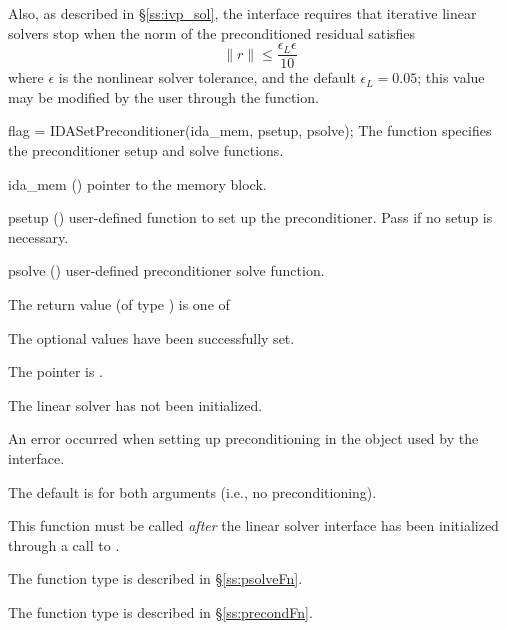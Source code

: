 {Also, as described in \S\ref{ss:ivp_sol}, the {\idals} interface
requires that iterative linear solvers stop when the norm of the
preconditioned residual satisfies
\[
  \|r\| \le \frac{\epsilon_L \epsilon}{10}
\]
where $\epsilon$ is the nonlinear solver tolerance, and the default
$\epsilon_L = 0.05$; this value may be modified by the user through
the  function.


{
  flag = IDASetPreconditioner(ida\_mem, psetup, psolve);
}
{
  The function  specifies the preconditioner
  setup and solve functions.
}
{
  \begin{args}
  \item[ida\_mem] ()
    pointer to the {\idas} memory block.
  \item[psetup] ()
    user-defined function to set up the preconditioner.  Pass  if no
    setup is necessary.
  \item[psolve] ()
    user-defined preconditioner solve function.
  \end{args}
}
{
  The return value  (of type ) is one of
  \begin{args}
  \item[\Id{IDALS\_SUCCESS}]
    The optional values have been successfully set.
  \item[\Id{IDALS\_MEM\_NULL}]
    The  pointer is .
  \item[\Id{IDALS\_LMEM\_NULL}]
    The {\idals} linear solver has not been initialized.
  \item[\Id{IDALS\_SUNLS\_FAIL}]
    An error occurred when setting up preconditioning in the
    {\sunlinsol} object used by the {\idals} interface.
  \end{args}
}
{
  The default is  for both arguments (i.e., no
  preconditioning).

  This function must be called \emph{after} the {\idals} linear solver
  interface has been initialized through a call to .

  The function type  is described in \S\ref{ss:psolveFn}.

  The function type  is described in \S\ref{ss:precondFn}.

}}
